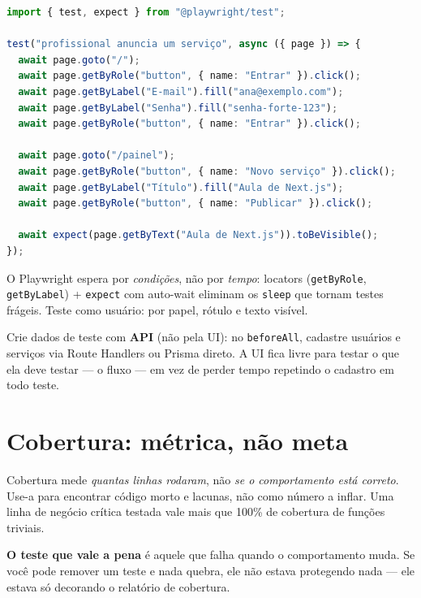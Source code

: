 \begin{lstlisting}[style=livro, language=TypeScript,
  caption={E2E: o fluxo completo de um pedido.}, label={list:teste-e2e}]
import { test, expect } from "@playwright/test";

test("profissional anuncia um serviço", async ({ page }) => {
  await page.goto("/");
  await page.getByRole("button", { name: "Entrar" }).click();
  await page.getByLabel("E-mail").fill("ana@exemplo.com");
  await page.getByLabel("Senha").fill("senha-forte-123");
  await page.getByRole("button", { name: "Entrar" }).click();

  await page.goto("/painel");
  await page.getByRole("button", { name: "Novo serviço" }).click();
  await page.getByLabel("Título").fill("Aula de Next.js");
  await page.getByRole("button", { name: "Publicar" }).click();

  await expect(page.getByText("Aula de Next.js")).toBeVisible();
});
\end{lstlisting}

\begin{caixaconceito}
O Playwright espera por \emph{condições}, não por \emph{tempo}: locators
(\texttt{getByRole}, \texttt{getByLabel}) + \texttt{expect} com auto-wait
eliminam os \texttt{sleep} que tornam testes frágeis. Teste como usuário: por
papel, rótulo e texto visível.
\end{caixaconceito}

\begin{caixadica}
Crie dados de teste com \textbf{API} (não pela UI): no \texttt{beforeAll},
cadastre usuários e serviços via Route Handlers ou Prisma direto. A UI fica
livre para testar o que ela deve testar — o fluxo — em vez de perder tempo
repetindo o cadastro em todo teste.
\end{caixadica}

\section{Cobertura: métrica, não meta}

Cobertura mede \emph{quantas linhas rodaram}, não \emph{se o comportamento está
correto}. Use-a para encontrar código morto e lacunas, não como número a
inflar. Uma linha de negócio crítica testada vale mais que 100\% de cobertura
de funções triviais.

\begin{caixaconceito}
\textbf{O teste que vale a pena} é aquele que falha quando o comportamento
muda. Se você pode remover um teste e nada quebra, ele não estava protegendo
nada — ele estava só decorando o relatório de cobertura.
\end{caixaconceito}

